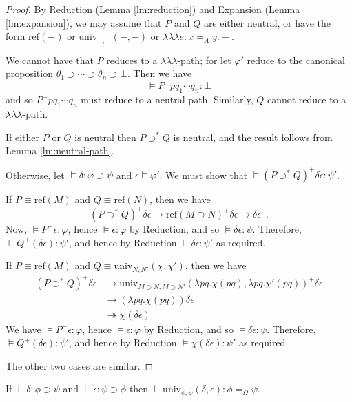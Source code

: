 \documentclass[a4paper,UKenglish]{lipics-v2016}
\newcommand*{\reff}[1]{\ensuremath{\mathrm{ref} \left( {#1} \right)}}
\newcommand*{\univ}[4]{\ensuremath{\mathrm{univ}_{{#1}, {#2}} \left({#3} , {#4} \right)}}
\newcommand*{\triplelambda}{\ensuremath{\lambda \!\! \lambda \!\! \lambda}}
\theoremstyle{plain}
\theoremstyle{definition}
\begin{document}
\begin{proof}
By Reduction (Lemma \ref{lm:reduction}) and Expansion (Lemma \ref{lm:expansion}), we may assume that $P$ and $Q$ are either neutral, or have the form $\reff{-}$ or $\univ{-}{-}{-}{-}$ or $\triplelambda e : x =_A y.-$.

We cannot have that $P$ reduces to a $\triplelambda$-path; for let $\varphi'$ reduce to the canonical proposition $\theta_1 \supset \cdots \supset \theta_n \supset \bot$.  Then we have
\[ \models P^+ p q_1 \cdots q_n : \bot \]
and so $P^+ p q_1 \cdots q_n$ must reduce to a neutral path.  Similarly, $Q$ cannot reduce to a $\triplelambda$-path.

If either $P$ or $Q$ is neutral then $P \supset^* Q$ is neutral, and the result follows from Lemma \ref{lm:neutral-path}.

Otherwise, let $\models \delta : \varphi \supset \psi$ and $\epsilon \models \varphi'$.  We must show that $\models (P \supset^* Q)^+ \delta \epsilon : \psi'$.

If $P \equiv \reff{M}$ and $Q \equiv \reff{N}$, then we have
$$ (P \supset^* Q)^+ \delta \epsilon \rightarrow \reff{M \supset N}^+ \delta \epsilon \rightarrow \delta \epsilon \enspace . $$
Now, $\models P^- \epsilon : \varphi$, hence $\models \epsilon : \varphi$ by Reduction, and so $\models \delta \epsilon : \psi$.  Therefore, $\models Q^+ (\delta \epsilon) : \psi'$,
and hence by Reduction $\models \delta \epsilon : \psi'$ as required.

If $P \equiv \reff{M}$ and $Q \equiv \univ{N}{N'}{\chi}{\chi'}$, then we have
\begin{align*}
(P \supset^* Q)^+ \delta \epsilon & \rightarrow \univ{M \supset N}{M \supset N'}{\lambda pq.\chi(pq)}{\lambda pq.\chi'(pq)}^+ \delta \epsilon \\
& \rightarrow (\lambda pq.\chi(pq)) \delta \epsilon \\
& \twoheadrightarrow \chi (\delta \epsilon)
\end{align*}
We have $\models P^- \epsilon : \varphi$, hence $\models \epsilon : \varphi$ by Reduction, and so $\models \delta \epsilon : \psi$.  Therefore,
$\models Q^+ (\delta \epsilon) : \psi'$, and hence by Reduction $\models \chi (\delta \epsilon) : \psi'$ as required.

The other two cases are similar.
\end{proof}

\begin{lemma}
\label{lm:univ-compute}
If $\models \delta : \phi \supset \psi$ and $\models \epsilon : \psi \supset \phi$ then $\models \univ{\phi}{\psi}{\delta}{\epsilon} : \phi =_\Omega \psi$.
\end{lemma}
\end{document}

